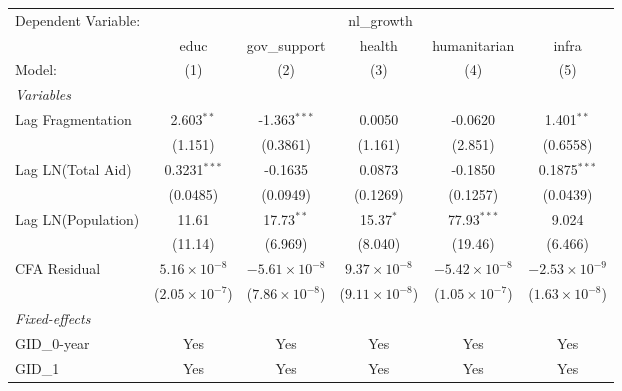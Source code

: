 \par\endgroup



\begingroup
\centering
\begin{tabular}{lccccc}
   \tabularnewline \midrule \midrule
   Dependent Variable: & \multicolumn{5}{c}{nl\_growth}\\
                      & educ                    & gov\_support            & health                  & humanitarian            & infra \\   
   Model:             & (1)                     & (2)                     & (3)                     & (4)                     & (5)\\  
   \midrule
   \emph{Variables}\\
   Lag Fragmentation  & 2.603$^{**}$            & -1.363$^{***}$          & 0.0050                  & -0.0620                 & 1.401$^{**}$\\   
                      & (1.151)                 & (0.3861)                & (1.161)                 & (2.851)                 & (0.6558)\\   
   Lag LN(Total Aid)  & 0.3231$^{***}$          & -0.1635                 & 0.0873                  & -0.1850                 & 0.1875$^{***}$\\   
                      & (0.0485)                & (0.0949)                & (0.1269)                & (0.1257)                & (0.0439)\\   
   Lag LN(Population) & 11.61                   & 17.73$^{**}$            & 15.37$^{*}$             & 77.93$^{***}$           & 9.024\\   
                      & (11.14)                 & (6.969)                 & (8.040)                 & (19.46)                 & (6.466)\\   
   CFA Residual       & $5.16\times 10^{-8}$    & $-5.61\times 10^{-8}$   & $9.37\times 10^{-8}$    & $-5.42\times 10^{-8}$   & $-2.53\times 10^{-9}$\\    
                      & ($2.05\times 10^{-7}$)  & ($7.86\times 10^{-8}$)  & ($9.11\times 10^{-8}$)  & ($1.05\times 10^{-7}$)  & ($1.63\times 10^{-8}$)\\    
   \midrule
   \emph{Fixed-effects}\\
   GID\_0-year        & Yes                     & Yes                     & Yes                     & Yes                     & Yes\\  
   GID\_1             & Yes                     & Yes                     & Yes                     & Yes                     & Yes\\  

\end{tabular}
